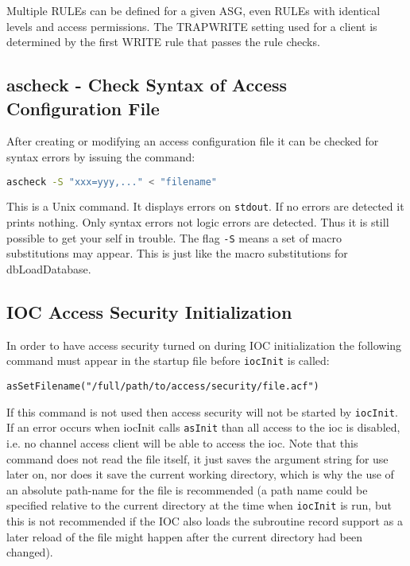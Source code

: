 Multiple RULEs can be defined for a given ASG, even RULEs with identical levels and access permissions.
The TRAPWRITE setting used for a client is determined by the first WRITE rule that passes the rule checks.

\subsection{ascheck - Check Syntax of Access Configuration File}

After creating or modifying an access configuration file it can be checked for syntax errors by issuing the command:

\begin{lstlisting}[language=sh]
ascheck -S "xxx=yyy,..." < "filename"
\end{lstlisting}

This is a Unix command. It displays errors on \verb|stdout|. If no errors are detected it prints nothing. Only syntax errors not 
logic errors are detected. Thus it is still possible to get your self in trouble. The flag \verb|-S| means a set of macro 
substitutions may appear. This is just like the macro substitutions for dbLoadDatabase.

\subsection{IOC Access Security Initialization}

In order to have access security turned on during IOC initialization the following command must appear in the startup file 
before \verb|iocInit| is called:

\begin{verbatim}
asSetFilename("/full/path/to/access/security/file.acf")
\end{verbatim}

If this command is not used then access security will not be started by \verb|iocInit|. If an error occurs when iocInit calls 
\verb|asInit| than all access to the ioc is disabled, i.e. no channel access client will be able to access the ioc. Note that this 
command does not read the file itself, it just saves the argument string for use later on, nor does it save the current 
working directory, which is why the use of an absolute path-name for the file is recommended (a path name could be 
specified relative to the current directory at the time when \verb|iocInit| is run, but this is not recommended if the IOC also 
loads the subroutine record support as a later reload of the file might happen after the current directory had been changed).

